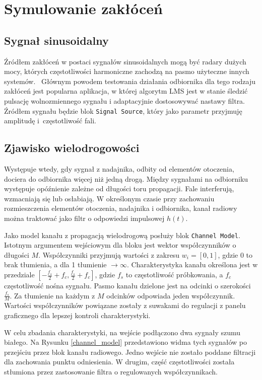 \section{Symulowanie zakłóceń}
\subsection{Sygnał sinusoidalny}
Źródłem zakłóceń w postaci sygnałów sinusoidalnych mogą być radary dużych mocy, których częstotliwości harmoniczne zachodzą na pasmo użyteczne innych systemów.~\cite{Haykin:2004:MWC:984217}
Głównym powodem testowania działania odbiornika dla tego rodzaju zakłóceń jest popularna aplikacja, w której algorytm LMS jest w stanie śledzić pulsację wolnozmiennego sygnału i adaptacyjnie dostosowywać nastawy filtra. \cite{Haykin:1996:AFT:230061}
Źródłem sygnału będzie blok \texttt{Signal Source}, który jako parametr przyjmuję amplitudę i~częstotliwość fali. 

\subsection{Zjawisko wielodrogowości}
Występuje wtedy, gdy sygnał z nadajnika, odbity od elementów otoczenia, dociera do odbiornika więcej niż jedną drogą. 
Między sygnałami na odbiorniku występuje opóźnienie zależne od długości toru propagacji.
Fale interferują, wzmacniają się lub osłabiają. 
W określonym czasie przy zachowaniu rozmieszczenia elementów otoczenia, nadajnika i odbiornika, kanał radiowy można traktować jako filtr o odpowiedzi impulsowej $h(t)$. \cite{Haykin:2004:MWC:984217} 

Jako model kanału z propagacją wielodrogową posłuży blok \texttt{Channel Model}. 
Istotnym argumentem wejściowym dla bloku jest wektor współczynników o długości $M$. 
Współczynniki przyjmują wartości z zakresu $w_i = [0,1]$, gdzie 0 to brak tłumienia, a dla 1 tłumienie $\to \infty$. 
Charakterystyka kanału określona jest w przedziale $[-\frac{f_s}{2} + f_c,\frac{f_s}{2} + f_c]$, gdzie $f_s$ to częstotliwość próbkowania, a $f_c$ częstotliwość nośna sygnału. 
Pasmo kanału dzielone jest na odcinki o szerokości $\frac{f_s}{M}$. 
Za tłumienie na każdym z $M$ odcinków odpowiada jeden współczynnik.
Wartości współczynników powiązane zostały z suwakami do regulacji z panelu graficznego dla lepszej kontroli charakterystyki.

W celu zbadania charakterystyki, na wejście podłączono dwa sygnały szumu białego. 
Na Rysunku \ref{channel_model} przedstawiono widma tych sygnałów po przejściu przez blok kanału radiowego. 
Jedno wejście nie zostało poddane filtracji dla zachowania punktu odniesienia. 
W drugim, część częstotliwości została stłumiona przez zastosowanie filtra o regulowanych współczynnikach.

